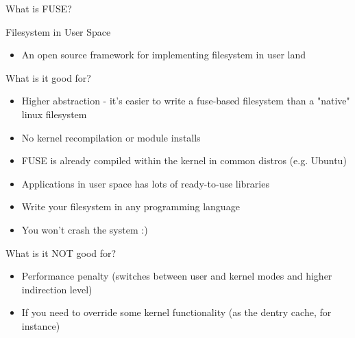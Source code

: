 \documentclass{beamer}
\begin{document}
\begin{frame}{What is FUSE?}

	\begin{block}{Filesystem in User Space}

		\begin{itemize}[<+->]

			\item{An open source framework for implementing filesystem in user land}\footnotemark[1]
	
		\end{itemize}

	\end{block}


\end{frame}

\begin{frame}{What is it good for?}

	\begin{itemize}[<+->]

		\item{Higher abstraction - it's easier to write a fuse-based filesystem than a "native" linux filesystem}

		\item{No kernel recompilation or module installs}
		
		\item{FUSE is already compiled within the kernel in common distros (e.g. Ubuntu)}
	
		\item{Applications in user space has lots of ready-to-use libraries}

		\item{Write your filesystem in any programming language}
		
		\item{You won't crash the system :)}
	
	\end{itemize}

\end{frame}

\begin{frame}{What is it NOT good for?}

	\begin{itemize}[<+->]

		\item{Performance penalty (switches between user and kernel modes and higher indirection level)}

		\item{If you need to override some kernel functionality (as the dentry cache, for instance)}
	
	\end{itemize}

\end{frame}
\end{document}
